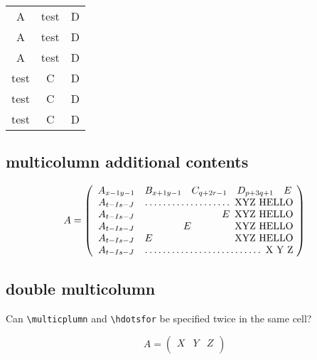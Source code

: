 \documentclass[11pt]{revtex4-1}
\begin{document}
\begin{center}
  \begin{tabular}{||c||c||c||c||}
    A & \multicolumn{2}{c}{test} & D \\ %
    A & \multicolumn{2}{|c|}{test} & D \\ %
    A & \multicolumn{2}{||c||}{test} & D \\ %
    \multicolumn{2}{c}{test} & C & D \\
    \multicolumn{2}{|c|}{test} & C & D \\
    \multicolumn{2}{||c||}{test} & C & D
  \end{tabular}
\end{center}

\subsection{multicolumn additional contents}

\begin{equation}
  A = \left(\begin{array}{ccccccc}
    A_{x-1 y-1} & B_{x+1 y-1} & C_{q+2 r-1} & D_{p+3 q+1} & E \\
    A_{t-I s-J} & \hdotsfor{4} XYZ HELLO \\
    A_{t-I s-J} & \multicolumn{4}{r}{E} XYZ HELLO \\
    A_{t-I s-J} & \multicolumn{4}{c}{E} XYZ HELLO \\
    A_{t-I s-J} & \multicolumn{4}{l}{E} XYZ HELLO \\
    A_{t-I s-J} & \hdotsfor{4} X~Y~Z \\
  \end{array}\right)
\end{equation}

\subsection{double multicolumn}
Can \verb+\multicplumn+ and \verb+\hdotsfor+ be specified twice in the same cell?

\begin{equation}
  A = \left(\begin{array}{cccc}
    X & Y & Z \\
  \end{array}\right)
\end{equation}
\end{document}
